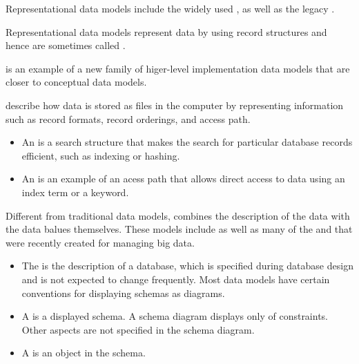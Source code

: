       \par Representational data models include the widely used , as well as the legacy .
      \par Representational data models represent data by using record
        structures and hence are sometimes called .
      \par {} is an example of a new family of higer-level
        implementation data models that are closer to conceptual data models.

      \par {} describe how data is stored as files in
        the computer by representing information such as record formats, record
        orderings, and access path.
      \begin{itemize}
        \item An  is a search structure that makes the search
          for particular database records efficient, such as indexing or
          hashing.
        \item An  is an example of an acess path that allows direct
          access to data using an index term or a keyword.
      \end{itemize}

      \par Different from traditional data models,  combines the description of the data with the data balues
        themselves. These models include  as well as many of the
       and  that were recently created
        for managing big data.

      \begin{itemize}
        \item The  is the description of a database, which
          is specified during database design and is not expected to change
          frequently. Most data models have certain conventions for displaying
          schemas as diagrams.
        \item A  is a displayed schema. A schema diagram
          displays only  of constraints. Other aspects are not
          specified in the schema diagram.
        \item A  is an object in the schema.
      \end{itemize}

